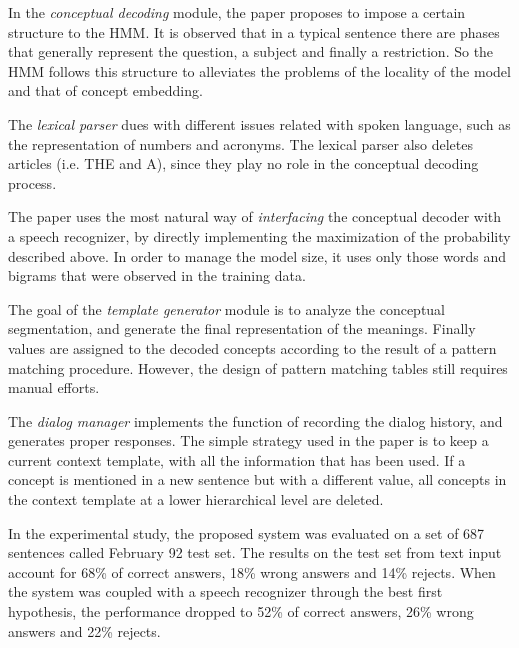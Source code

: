 In the \emph{conceptual decoding} module, the paper proposes to impose a certain structure to the HMM. It is observed that in a typical sentence there are phases that generally represent the question, a subject and finally a restriction. So the HMM follows this structure to alleviates the problems of the locality of the model and that of concept embedding.

The \emph{lexical parser} dues with different issues related with spoken language, such as the representation of numbers and acronyms. The lexical parser also deletes articles (i.e. THE and A), since they play no role in the conceptual decoding process.

The paper uses the most natural way of \emph{interfacing} the conceptual decoder with a speech recognizer, by directly implementing the maximization of the probability described above. In order to manage the model size, it uses only those words and bigrams that were observed in the training data.

The goal of the \emph{template generator} module is to analyze the conceptual segmentation, and generate the final representation of the meanings. Finally values are assigned to the decoded concepts according to the result of a pattern matching procedure. However, the design of pattern matching tables still requires manual efforts.

The \emph{dialog manager} implements the function of recording the dialog history, and generates proper responses. The simple strategy used in the paper is to keep a current context template, with all the information that has been used. If a concept is mentioned in a new sentence but with a different value, all concepts in the context template at a lower hierarchical level are deleted.

In the experimental study, the proposed system was evaluated on a set of 687 sentences called February 92 test set. The results on the test set from text input account for 68\% of correct answers, 18\% wrong answers and 14\% rejects. When the system was coupled with a speech recognizer through the best first hypothesis, the performance dropped to 52\% of correct answers, 26\% wrong answers and 22\% rejects.
